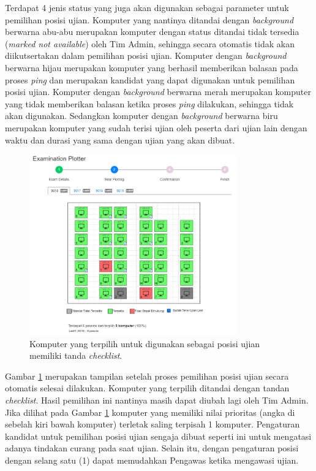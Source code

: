 \documentclass[a4paper,twoside]{article}
\begin{document}
\begin{enumerate}
\begin{itemize}
\begin{itemize}
		        Terdapat 4 jenis status yang juga akan digunakan sebagai parameter untuk pemilihan posisi ujian. Komputer yang nantinya ditandai dengan \textit{background} berwarna abu-abu merupakan komputer dengan status ditandai tidak tersedia (\textit{marked not available}) oleh Tim Admin, sehingga secara otomatis tidak akan diikutsertakan dalam pemilihan posisi ujian. Komputer dengan \textit{background} berwarna hijau merupakan komputer yang berhasil memberikan balasan pada proses \textit{ping} dan merupakan kandidat yang dapat digunakan untuk pemilihan posisi ujian. Komputer dengan  \textit{background} berwarna merah merupakan komputer yang tidak memberikan balasan ketika proses \textit{ping} dilakukan, sehingga tidak akan digunakan. Sedangkan komputer dengan \textit{background} berwarna biru merupakan komputer yang sudah terisi ujian oleh peserta dari ujian lain dengan waktu dan durasi yang sama dengan ujian yang akan dibuat.
		        
                \begin{figure}[ht]
                    \centering
                    \includegraphics[width=0.8\textwidth]{images/ui designs/automation/step-2-3-selected-1.png}
                    \caption{Komputer yang terpilih untuk digunakan sebagai posisi ujian memiliki tanda \textit{checklist}.}
                    \label{fig:automation-autoselect-selected}
                \end{figure}
		        
		        Gambar \ref{fig:automation-autoselect-selected} merupakan tampilan setelah proses pemilihan posisi ujian secara otomatis selesai dilakukan. Komputer yang terpilih ditandai dengan tandan \textit{checklist}. Hasil pemilihan ini nantinya masih dapat diubah lagi oleh Tim Admin. Jika dilihat pada Gambar \ref{fig:automation-autoselect-selected} komputer yang memiliki nilai prioritas (angka di sebelah kiri bawah komputer) terletak saling terpisah 1 komputer. Pengaturan kandidat untuk pemilihan posisi ujian sengaja dibuat seperti ini untuk mengatasi adanya tindakan curang pada saat ujian. Selain itu, dengan pengaturan posisi dengan selang satu (1) dapat memudahkan Pengawas ketika mengawasi ujian.
		        

\end{itemize}
\end{itemize}
\end{enumerate}
\end{document}

